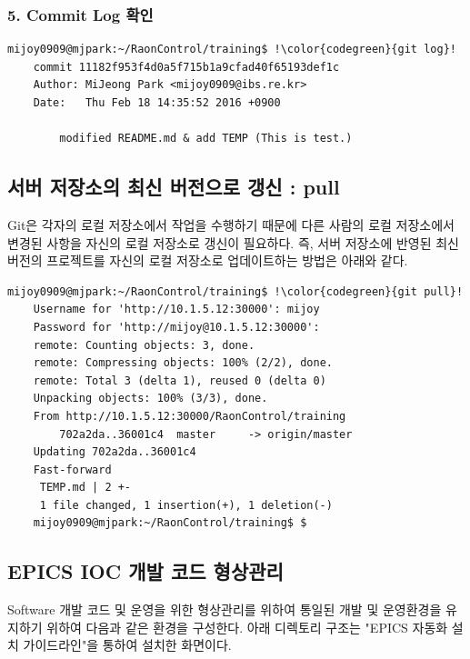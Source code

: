 \documentclass[11pt
  , a4paper
  , article
  , oneside
]{memoir}
\begin{document}
	\subsubsection {5. Commit Log 확인}
	\begin{lstlisting}[style=termstyle, escapechar=!]	
	mijoy0909@mjpark:~/RaonControl/training$ !\color{codegreen}{git log}!
	commit 11182f953f4d0a5f715b1a9cfad40f65193def1c
	Author: MiJeong Park <mijoy0909@ibs.re.kr>
	Date:   Thu Feb 18 14:35:52 2016 +0900
	
    	modified README.md & add TEMP (This is test.) \end{lstlisting}	

\vspace{5mm}
\subsection{서버 저장소의 최신 버전으로 갱신 : pull}
Git은 각자의 로컬 저장소에서 작업을 수행하기 때문에 다른 사람의 로컬 저장소에서 변경된 사항을 자신의 로컬 저장소로 갱신이 필요하다. 즉, 서버 저장소에 반영된 최신 버전의 프로젝트를 자신의 로컬 저장소로 업데이트하는 방법은 아래와 같다. 

	\begin{lstlisting}[style=termstyle, escapechar=!]	
	mijoy0909@mjpark:~/RaonControl/training$ !\color{codegreen}{git pull}!
	Username for 'http://10.1.5.12:30000': mijoy
	Password for 'http://mijoy@10.1.5.12:30000': 
	remote: Counting objects: 3, done.
	remote: Compressing objects: 100% (2/2), done.
	remote: Total 3 (delta 1), reused 0 (delta 0)
	Unpacking objects: 100% (3/3), done.
	From http://10.1.5.12:30000/RaonControl/training
    	702a2da..36001c4  master     -> origin/master
	Updating 702a2da..36001c4
	Fast-forward
	 TEMP.md | 2 +-
	 1 file changed, 1 insertion(+), 1 deletion(-)
	mijoy0909@mjpark:~/RaonControl/training$ $  \end{lstlisting}		

\subsection{EPICS IOC 개발 코드 형상관리}
Software 개발 코드 및 운영을 위한 형상관리를 위하여 통일된 개발 및 운영환경을 유지하기 위하여 다음과 같은 환경을 구성한다. 아래 디렉토리 구조는 "EPICS 자동화 설치 가이드라인"을 통하여 설치한 화면이다.
\end{document}
